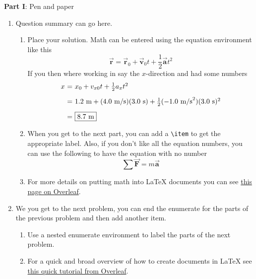 \documentclass{article}
\begin{document}
\large{\textbf{Part I}: Pen and paper}\normalsize

\begin{enumerate}[leftmargin=\labelsep]
\item Question summary can go here.
    \begin{enumerate}
    \item Place your solution. Math can be entered using the equation
    environment like this
    \begin{equation}
        \vec{\mathbf{r}} = \vec{\mathbf{r}}_{0} + \vec{\mathbf{v}}_{0}t + \frac{1}{2}\vec{\mathbf{a}}t^{2}
    \end{equation}
    If you then where working in say the $x$-direction and had some numbers %
    \begin{equation}
    \begin{array}{r@{~=~}l}
    x & x_{0} + v_{x0}t + \frac{1}{2}a_{x}t^{2} \\ [2ex]
    & 1.2~\text{m} + (4.0~\text{m/s})(3.0~\text{s}) + \frac{1}{2}(-1.0~\text{m/s}^{2})(3.0~\text{s})^{2}\\ [2ex]
    & \boxed{8.7~\text{m}}
    \end{array}
    \end{equation}

    \item When you get to the next part, you can add a \verb"\item" to get the appropriate label. Also,
    if you don't like all the equation numbers, you can use the following to have the equation with
    no number
    \begin{equation*}
    \sum\vec{\mathbf{F}} = m\vec{\mathbf{a}}
    \end{equation*}

    \item For more details on putting math into {\LaTeX} documents you can see 
    \href{https://www.overleaf.com/learn/latex/Mathematical_expressions}{this page on Overleaf}.
    \end{enumerate}

\item We you get to the next problem, you can end the enumerate for the parts of the previous problem and then add another item.
    \begin{enumerate}
    \item Use a nested enumerate environment to label the parts of the next problem.
    \item For a quick and broad overview of how to create documents in {\LaTeX} see 
    \href{https://www.overleaf.com/learn/latex/Learn_LaTeX_in_30_minutes}{this quick tutorial from Overleaf}.
    \end{enumerate}


\end{enumerate}
\end{document}
